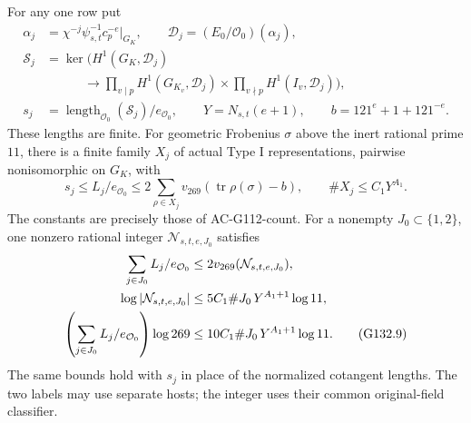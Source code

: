 \begin{theorem}
For any one row put
\[
\begin{split}
 \alpha_j&=\chi^{-j}\psi_{s,t}^{-1}c_p^{-e}|_{G_K},\qquad
 \mathcal D_j=(E_0/\mathcal O_0)(\alpha_j),\\
 \mathcal S_j&=\ker\bigl(H^1(G_K,\mathcal D_j)\\
 &\hspace{3em}\longrightarrow
 \prod_{v\mid p}H^1(G_{K_v},\mathcal D_j)
 \times\prod_{v\nmid p}H^1(I_v,\mathcal D_j)\bigr),\\
 s_j&=\operatorname{length}_{\mathcal O_0}(\mathcal S_j)/
             e_{\mathcal O_0},\qquad
 Y=N_{s,t}(e+1),\qquad b=121^e+1+121^{-e}.
\end{split}
\tag{G132.7}
\]
These lengths are finite.  For geometric Frobenius \(\sigma\)
above the inert rational prime \(11\), there is a finite family
\(X_j\) of actual Type I representations, pairwise nonisomorphic
on \(G_K\), with
\[
 s_j\le L_j/e_{\mathcal O_0}
 \le2\sum_{\rho\in X_j}v_{269}(\operatorname{tr}\rho(\sigma)-b),
 \qquad \#X_j\le C_1Y^{A_1}.
 \tag{G132.8}
\]
The constants are precisely those of AC-G112-count.
For a nonempty \(J_0\subset\{1,2\}\), one nonzero rational integer
\(\mathcal N_{s,t,e,J_0}\) satisfies
\begin{align}
 \sum_{j\in J_0}L_j/e_{\mathcal O_0}
       &\le2v_{269}(\mathcal N_{s,t,e,J_0}),\notag\\
 \log|\mathcal N_{s,t,e,J_0}|
       &\le5C_1\#J_0\,Y^{A_1+1}\log11,\notag\\
 \left(\sum_{j\in J_0}L_j/e_{\mathcal O_0}\right)\log269
       &\le10C_1\#J_0\,Y^{A_1+1}\log11.
 \tag{G132.9}
\end{align}
The same bounds hold with \(s_j\) in place of the normalized
cotangent lengths.  The two labels may use separate hosts; the
integer uses their common original-field classifier.
\end{theorem}

